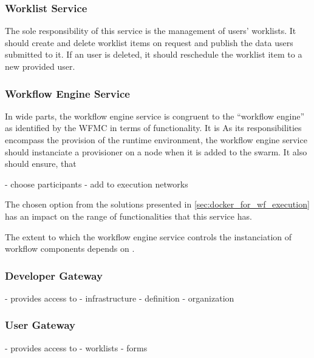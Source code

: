     \subsubsection{Worklist Service} %
      \label{subs:worklist_service}
      The sole responsibility of this service is the management of users' worklists. It should create and delete worklist items on request and publish the data users submitted to it. If an user is deleted, it should reschedule the worklist item to a new provided user.

    \subsubsection{Workflow Engine Service} %
      \label{subs:workflow_engine_service}

      In wide parts, the workflow engine service is congruent to the ``workflow engine'' as identified by the \ac{WFMC} in terms of functionality. It is
      As its responsibilities encompass the provision of the runtime environment, the workflow engine service should instanciate a provisioner on a node when it is added to the swarm. It also should ensure, that

      - choose participants
      - add to execution networks

      The chosen option from the solutions presented in \ref{sec:docker_for_wf_execution} has an impact on the range of functionalities that this service has.

      The extent to which the workflow engine service controls the instanciation of workflow components depends on .

    \subsubsection{Developer Gateway} %
      \label{subs:developer_gateway}



        - provides access to
          - infrastructure
          - definition
          - organization

    \subsubsection{User Gateway} %
      \label{subs:user_gateway}
        - provides access to
          - worklists
          - forms

